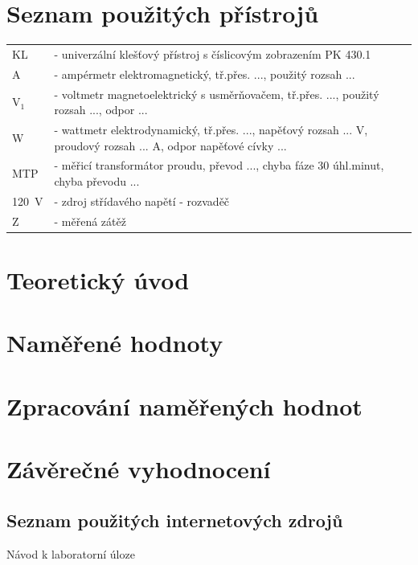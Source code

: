 \documentclass[a4paper,12pt]{article}   %
\newcommand{\tsub}[1]{$_\textrm{#1}$}
\begin{document}
\section{Seznam použitých přístrojů}
\begin{tabular}{ll}
  KL &    - univerzální klešťový přístroj s číslicovým zobrazením PK 430.1\\
  A  &    - ampérmetr elektromagnetický, tř.přes. ..., použitý rozsah ...\\
  V\tsub{1}  &- voltmetr magnetoelektrický s usměrňovačem, tř.přes. ..., použitý rozsah ..., odpor ...\\
  W &     - wattmetr elektrodynamický, tř.přes. ..., napěťový rozsah ... V, proudový rozsah ... A, odpor napěťové cívky ... \\
  MTP &   - měřicí transformátor proudu, převod ..., chyba fáze 30 úhl.minut, chyba převodu ... \\
  120~V&  - zdroj střídavého napětí - rozvaděč\\
  Z &     - měřená zátěž\\
\end{tabular}

\section{Teoretický úvod}



\section{Naměřené hodnoty}



\section{Zpracování naměřených hodnot}



\section{Závěrečné vyhodnocení}


\clearpage
\renewcommand{\refname}{Seznam použité literatury a~zdrojů informací} 

\begin{thebibliography}{99}

\subsection*{Seznam použitých internetových zdrojů}
     Návod k laboratorní úloze
    
\end{thebibliography}
\end{document}
